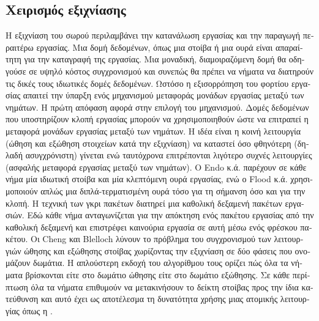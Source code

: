 \begin{greek}
\subsection{Χειρισμός εξιχνίασης}
Η εξιχνίαση του σωρού περιλαμβάνει την κατανάλωση εργασίας
και την παραγωγή περαιτέρω εργασίας. Μια δομή δεδομένων, όπως
μια στοίβα ή μια ουρά είναι απαραίτητη για την καταγραφή
της εργασίας. Μια μοναδική, διαμοιραζόμενη δομή θα οδηγούσε
σε υψηλό κόστος συγχρονισμού και συνεπώς θα πρέπει να νήματα
να διατηρούν τις δικές τους ιδιωτικές δομές δεδομένων. Ωστόσο
η εξισορρόπηση του φορτίου εργασίας απαιτεί την ύπαρξη ενός
μηχανισμού μεταφοράς μονάδων εργασίας μεταξύ των νημάτων.
Η πρώτη απόφαση αφορά στην επιλογή του μηχανισμού. Δομές
δεδομένων που υποστηρίζουν κλοπή εργασίας μπορούν να χρησιμοποιηθούν
ώστε να επιτραπεί η μεταφορά μονάδων εργασίας μεταξύ των νημάτων.
Η ιδέα είναι η κοινή λειτουργία (ώθηση και εξώθηση στοιχείων
κατά την εξιχνίαση) να καταστεί όσο φθηνότερη (δηλαδή ασυγχρόνιστη)
γίνεται ενώ ταυτόχρονα επιτρέπονται λιγότερο συχνές λειτουργίες
(ασφαλής μεταφορά εργασίας μεταξύ των νημάτων). Ο Endo κ.ά.
\cite{DBLP:conf/sc/EndoTY97} παρέχουν σε κάθε νήμα μία ιδιωτική
στοίβα και μία κλεπτόμενη ουρά εργασίας, ενώ ο Flood κ.ά.
\cite{DBLP:conf/jvm/FloodDSZ01}
χρησιμοποιούν απλώς μια διπλά-τερματισμένη ουρά τόσο για τη
σήμανση όσο και για την κλοπή. Η τεχνική των γκρι πακέτων
\cite{DBLP:conf/pldi/OssiaBGKLO02}
διατηρεί μια καθολική δεξαμενή πακέτων εργασιών. Εδώ κάθε
νήμα ανταγωνίζεται για την απόκτηση ενός πακέτου εργασίας
από την καθολική δεξαμενή και επιστρέφει καινούρια εργασία
σε αυτή μέσω ενός φρέσκου πακέτου. Οι Cheng και Blelloch
\cite{DBLP:conf/pldi/ChengB01} λύνουν το πρόβλημα του συγχρονισμού των λειτουργιών
ώθησης και εξώθησης στοίβας χωρίζοντας την εξιχνίαση σε δύο
φάσεις που ονομάζουν δωμάτια. Η απλούστερη εκδοχή του αλγορίθμου
τους ορίζει πώς όλα τα νήματα βρίσκονται είτε στο δωμάτιο
ώθησης είτε στο δωμάτιο εξώθησης. Σε κάθε περίπτωση όλα τα
νήματα επιθυμούν να μετακινήσουν το δείκτη στοίβας προς την
ίδια κατεύθυνση και αυτό έχει ως αποτέλεσμα τη δυνατότητα
χρήσης μιας ατομικής λειτουργίας όπως η .


\end{greek}
